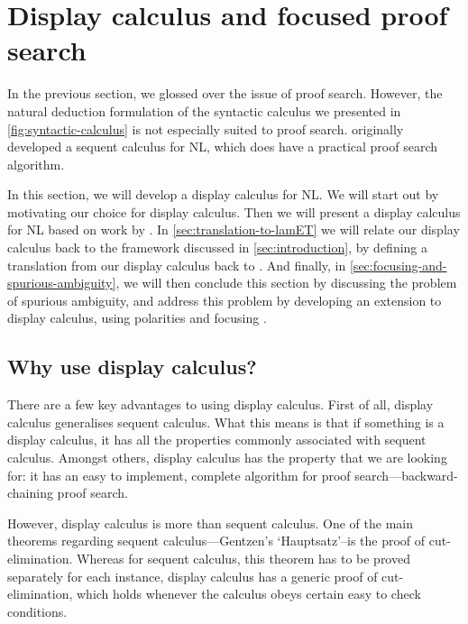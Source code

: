 \documentclass[a4paper]{article}
\begin{document}


\section{Display calculus and focused proof search}
\label{sec:display-calculus}

In the previous section, we glossed over the issue of proof
search. However, the natural deduction formulation of the syntactic
calculus we presented in \autoref{fig:syntactic-calculus} is not
especially suited to proof search. \citet{lambek1958} originally
developed a sequent calculus for NL, which does have a practical proof
search algorithm.

In this section, we will develop a display calculus
\citep{belnap1982} for NL. We will start out by motivating our choice
for display calculus. Then we will present a display calculus for NL
based on work by \citet{bernardi2010,gore1998}.
In \autoref{sec:translation-to-lamET} we will relate our display
calculus back to the framework discussed in
\autoref{sec:introduction}, by defining a translation from our display
calculus back to \lamET.
And finally, in \autoref{sec:focusing-and-spurious-ambiguity}, we will
then conclude this section by discussing the problem of spurious
ambiguity, and address this problem by developing an extension to
display calculus, using polarities and focusing
\citep{girard1991,bastenhof2012}.

\subsection{Why use display calculus?}
\label{sec:why-use-display-calculus}
There are a few key advantages to using display calculus. First of
all, display calculus generalises sequent calculus. What this means is
that if something is a display calculus, it has all the properties
commonly associated with sequent calculus. Amongst others, display
calculus has the property that we are looking for: it has an easy to
implement, complete algorithm for proof search---backward-chaining
proof search.

However, display calculus is more than sequent calculus. One of the
main theorems regarding sequent calculus---Gentzen's `Hauptsatz'--is
the proof of cut-elimination. Whereas for sequent calculus, this
theorem has to be proved separately for each instance, display
calculus has a generic proof of cut-elimination, which holds whenever
the calculus obeys certain easy to check conditions.
\end{document}
